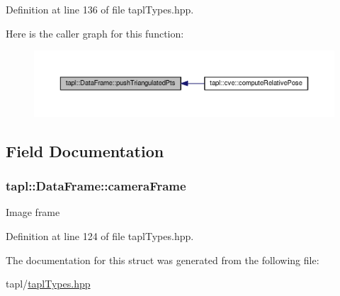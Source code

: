 Definition at line 136 of file tapl\+Types.\+hpp.



Here is the caller graph for this function\+:\nopagebreak
\begin{figure}[H]
\begin{center}
\leavevmode
\includegraphics[width=350pt]{structtapl_1_1DataFrame_a6a48c0c169570f49e3a3f87e2f947445_icgraph}
\end{center}
\end{figure}




\subsection{Field Documentation}
\subsubsection[{\texorpdfstring{camera\+Frame}{cameraFrame}}]{ tapl\+::\+Data\+Frame\+::camera\+Frame}\hypertarget{structtapl_1_1DataFrame_a6a9523806fd3280ddd54085669572288}{}\label{structtapl_1_1DataFrame_a6a9523806fd3280ddd54085669572288}
Image frame 

Definition at line 124 of file tapl\+Types.\+hpp.



The documentation for this struct was generated from the following file\+:\begin{DoxyCompactItemize}
\item 
tapl/\hyperlink{taplTypes_8hpp}{tapl\+Types.\+hpp}\end{DoxyCompactItemize}
